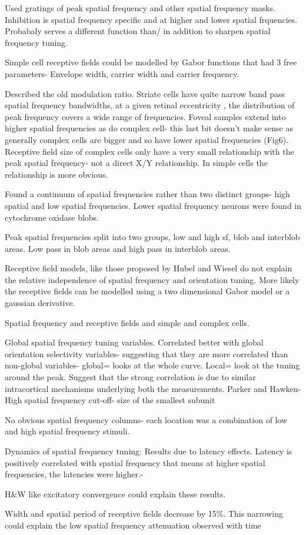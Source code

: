 \cite{DeValois1983} Used gratings of peak spatial frequency and other spatial frequency masks. Inhibition is spatial frequency specific and at higher and lower spatial frquencies. Probabaly serves a different function than/ in addition to sharpen spatial frequency tuning.


\cite{Field1986} Simple cell receptive fields could be modelled by Gabor functions that had 3 free parameters- Envelope width, carrier width and carrier frequency. 
	
	\cite{DeValois1982a} Described the old modulation ratio. Striate cells have quite narrow band pass spatial frequency bandwidths, at a given retinal eccentricity , the distribution of peak frequency covers a wide range of frequencies.  Foveal samples extend into higher spatial frequencies as do complex cell- this last bit doesn't make sense as generally complex cells are bigger and so have lower spatial frequencies (Fig6).
	Receptive field size of complex cells only have a very small relationship with the peak spatial frequency- not a direct X/Y relationship.
	In simple cells the relationship is more obvious. 
	
	\cite{Silverman1989} Found a continuum of spatial frequencies rather than two distinct groups- high spatial and low spatial frequencies. Lower spatial frequency neurons were found in cytochrome oxidase blobs.
	
	\cite{Born1991} Peak spatial frequencies split into two groups, low and high sf, blob and interblob areas. Low pass in blob areas and high pass in interblob areas.
	
	\cite{Webster1985} Receptive field models, like those proposed by Hubel and Wiesel do not explain the relative independence of spatial frequency and orientation tuning. More likely the receptive fields can be modelled using a two dimensional Gabor model or a gaussian derivative.
	
	Spatial frequency and receptive fields and simple and complex cells. 
	
\cite{Xing2004} Global spatial frequency tuning variables. Correlated better with global orientation selectivity variables- suggesting that they are more correlated than non-global variables- global= looks at the whole curve. Local= look at the tuning around the peak. Suggest that the strong correlation is due to similar intracortical mechanisms underlying both the measurements.
Parker and Hawken- High spatial frequency cut-off- size of the smallest subunit

\cite{Sirovich2004} No obvious spatial frequency columns- each location was a combination of low and high spatial frequency stimuli. 

\cite{Frazor2008} Dynamics of spatial frequency tuning: Results due to latency effects. Latency is positively correlated with spatial frequency that means at higher spatial frequencies, the latencies were higher.-

H\&W like excitatory convergence  could explain these results.

\cite{Malone2007} Width and spatial period of receptive fields decrease by 15\%. This narrowing could explain the low spatial frequency attenuation observed with time
	